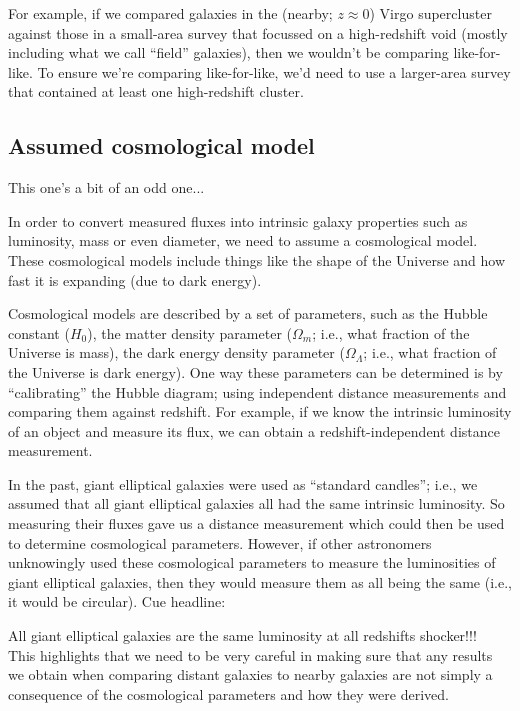 \documentclass[11pt]{article}
\begin{document}
For example, if we compared galaxies in the (nearby; $z\approx0$)
Virgo supercluster against those in a small-area survey that focussed
on a high-redshift void (mostly including what we call ``field''
galaxies), then we wouldn't be comparing like-for-like. To ensure
we're comparing like-for-like, we'd need to use a larger-area survey
that contained at least one high-redshift cluster.

\subsection{Assumed cosmological model}
This one's a bit of an odd one...

\noindent
In order to convert measured fluxes into intrinsic galaxy properties
such as luminosity, mass or even diameter, we need to assume a
cosmological model. These cosmological models include things like the
shape of the Universe and how fast it is expanding (due to dark
energy).

Cosmological models are described by a set of parameters, such as the
Hubble constant ($H_0$), the matter density parameter ($\Omega_m$;
i.e., what fraction of the Universe is mass), the dark energy density
parameter ($\Omega_\Lambda$; i.e., what fraction of the Universe is
dark energy). One way these parameters can be determined is by
``calibrating'' the Hubble diagram; using independent distance
measurements and comparing them against redshift. For example, if we
know the intrinsic luminosity of an object and measure its flux, we
can obtain a redshift-independent distance measurement.

In the past, giant elliptical galaxies were used as ``standard
candles''; i.e., we assumed that all giant elliptical galaxies all had
the same intrinsic luminosity. So measuring their fluxes gave us a
distance measurement which could then be used to determine
cosmological parameters. However, if other astronomers unknowingly
used these cosmological parameters to measure the luminosities of
giant elliptical galaxies, then they would measure them as all being
the same (i.e., it would be circular). Cue headline:

\vspace{3mm}
\noindent
{\Large All giant elliptical galaxies are the same luminosity at all
  redshifts shocker!!!}\\

This highlights that we need to be very careful in making sure that
any results we obtain when comparing distant galaxies to nearby
galaxies are not simply a consequence of the cosmological parameters
and how they were derived.
\end{document}
